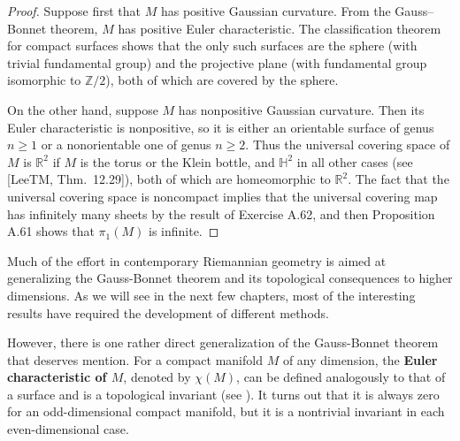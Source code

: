 \begin{proof}
Suppose first that $M$ has positive Gaussian curvature. From the Gauss--Bonnet theorem, $M$ has positive Euler characteristic. The classification theorem for compact surfaces shows that the only such surfaces are the sphere (with trivial fundamental group) and the projective plane (with fundamental group isomorphic to $\mathbb{Z}/2$), both of which are covered by the sphere.

On the other hand, suppose $M$ has nonpositive Gaussian curvature. Then its Euler characteristic is nonpositive, so it is either an orientable surface of genus $n \ge 1$ or a nonorientable one of genus $n \ge 2$. Thus the universal covering space of $M$ is $\mathbb{R}^2$ if $M$ is the torus or the Klein bottle, and $\mathbb{H}^2$ in all other cases (see [LeeTM, Thm.~12.29]), both of which are homeomorphic to $\mathbb{R}^2$. The fact that the universal covering space is noncompact implies that the universal covering map has infinitely many sheets by the result of Exercise A.62, and then Proposition A.61 shows that $\pi_1(M)$ is infinite.
\end{proof}

Much of the effort in contemporary Riemannian geometry is aimed at generalizing the Gauss-Bonnet theorem and its topological consequences to higher dimensions. As we will see in the next few chapters, most of the interesting results have required the development of different methods.

However, there is one rather direct generalization of the Gauss-Bonnet theorem that deserves mention. For a compact manifold $M$ of any dimension, the \textbf{Euler characteristic of $M$}, denoted by $\chi(M)$, can be defined analogously to that of a surface and is a topological invariant (see \cite[Thm. 13.36]{LeeTM}). It turns out that it is always zero for an odd-dimensional compact manifold, but it is a nontrivial invariant in each even-dimensional case.

